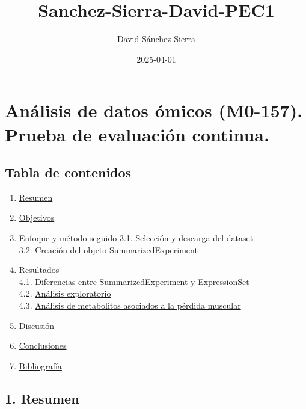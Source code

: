\documentclass[
]{article}
\title{Sanchez-Sierra-David-PEC1}
\author{David Sánchez Sierra}
\date{2025-04-01}
\providecommand{\tightlist}{%
  \setlength{\itemsep}{0pt}\setlength{\parskip}{0pt}}
\begin{document}
\maketitle

\section{Análisis de datos ómicos (M0-157). Prueba de evaluación
continua.}\label{anuxe1lisis-de-datos-uxf3micos-m0-157.-prueba-de-evaluaciuxf3n-continua.}

\subsection{Tabla de contenidos}\label{tabla-de-contenidos}

\begin{enumerate}
\def\labelenumi{\arabic{enumi}.}
\tightlist
\item
  \hyperref[resumen]{Resumen}\\
\item
  \hyperref[objetivos]{Objetivos}\\
\item
  \hyperref[enfoque-y-muxe9todo-seguido]{Enfoque y método seguido} 3.1.
  \hyperref[selecciuxf3n-y-descarga-del-dataset]{Selección y descarga
  del dataset}\\
  3.2. \hyperref[creaciuxf3n-del-objeto-summarizedexperiment]{Creación
  del objeto SummarizedExperiment}\\
\item
  \hyperref[resultados]{Resultados}\\
  4.1.
  \hyperref[diferencias-entre-summarizedexperiment-y-expressionset]{Diferencias
  entre SummarizedExperiment y ExpressionSet}\\
  4.2. \hyperref[anuxe1lisis-exploratorio]{Análisis exploratorio}\\
  4.3. \hyperref[anova]{Análisis de metabolitos asociados a la pérdida
  muscular}\\
\item
  \hyperref[discusiuxf3n]{Discusión}\\
\item
  \hyperref[conclusiones]{Conclusiones}\\
\item
  \hyperref[bibliografuxeda]{Bibliografía}
\end{enumerate}

\subsection{1. Resumen}\label{resumen}
\end{document}
